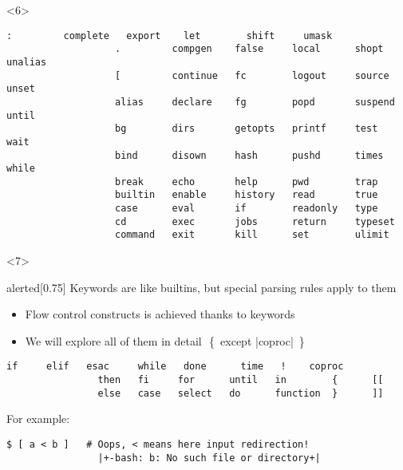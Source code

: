 \begin{frame}
\begin{overlayarea}{\textwidth}{0.7\textheight}
\begin{onlyenv}
\begin{onlyenv}
            \end{onlyenv}
            \begin{onlyenv}<6>
                \begin{lstlisting}[style=MyBash, numbers=none]
                   :         complete   export    let        shift     umask  
                   .         compgen    false     local      shopt     unalias
                   [         continue   fc        logout     source    unset  
                   alias     declare    fg        popd       suspend   until  
                   bg        dirs       getopts   printf     test      wait   
                   bind      disown     hash      pushd      times     while  
                   break     echo       help      pwd        trap      
                   builtin   enable     history   read       true      
                   case      eval       if        readonly   type      
                   cd        exec       jobs      return     typeset   
                   command   exit       kill      set        ulimit    
                \end{lstlisting}
            \end{onlyenv}
        \end{onlyenv}
        \begin{onlyenv}<7>
            \begin{varblock}{alerted}[0.75\textwidth]{}
                Keywords are like builtins, but \alert{special parsing rules apply to them}
            \end{varblock}
            \begin{itemize}
                \item Flow control constructs is achieved thanks to keywords
                \item We will explore all of them in detail \,\,{\tiny\{~except \bash|coproc|~\}}
            \end{itemize}
            \begin{lstlisting}[style=MyBash, numbers=none]
                if     elif   esac     while   done      time   !    coproc
                then   fi     for      until   in        {      [[
                else   case   select   do      function  }      ]]
            \end{lstlisting}
            \bigskip
            For example:
            \medskip
            \begin{lstlisting}[style=MyBash]
                $ [ a < b ]   # Oops, < means here input redirection!
                |+-bash: b: No such file or directory+|

\end{lstlisting}
\end{onlyenv}
\end{overlayarea}
\end{frame}
